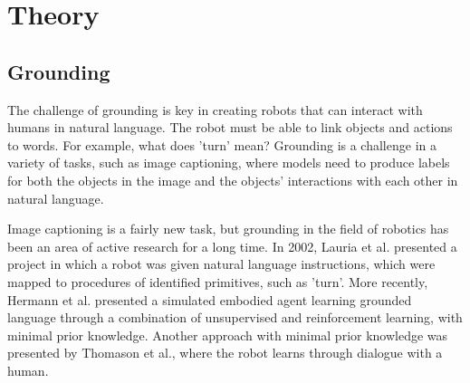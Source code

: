\chapter{Theory}
\section{Grounding}
The challenge of grounding is key in creating robots that can interact with humans in natural language. The robot must be able to link objects and actions to words. For example, what does 'turn' mean? Grounding is a challenge in a variety of tasks, such as image captioning, where models need to produce labels for both the objects in the image and the objects' interactions with each other in natural language\cite{karpathy2014captioning}.

Image captioning is a fairly new task, but grounding in the field of robotics has been an area of active research for a long time. In 2002, Lauria et al. presented a project in which a robot was given natural language instructions, which were mapped to procedures of identified primitives, such as 'turn'\cite{lauria2002}. More recently, Hermann et al. presented a simulated embodied agent learning grounded language through a combination of unsupervised and reinforcement learning, with minimal prior knowledge\cite{hermann2017grounded}. Another approach with minimal prior knowledge was presented by Thomason et al., where the robot learns through dialogue with a human\cite{thomason2019grounded}.

